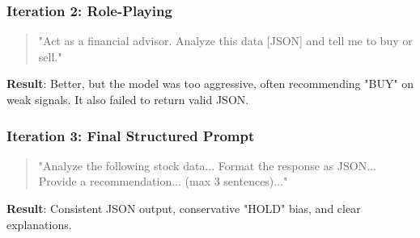 \subsubsection{Iteration 2: Role-Playing}
\begin{quote}
    "Act as a financial advisor. Analyze this data [JSON] and tell me to buy or sell."
\end{quote}
\textbf{Result}: Better, but the model was too aggressive, often recommending "BUY" on weak signals. It also failed to return valid JSON.

\subsubsection{Iteration 3: Final Structured Prompt}
\begin{quote}
    "Analyze the following stock data... Format the response as JSON... Provide a recommendation... (max 3 sentences)..."
\end{quote}
\textbf{Result}: Consistent JSON output, conservative "HOLD" bias, and clear explanations.
